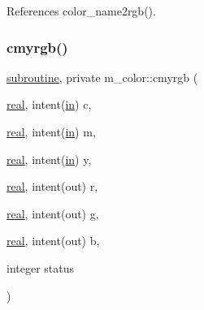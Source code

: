 References color\+\_\+name2rgb().

\mbox{\label{namespacem__color_ab91687e87d0901874e52efe5933e3044}} 
\subsubsection{\texorpdfstring{cmyrgb()}{cmyrgb()}}
{\footnotesize\ttfamily \hyperlink{M__stopwatch_83_8txt_acfbcff50169d691ff02d4a123ed70482}{subroutine}, private m\+\_\+color\+::cmyrgb (\begin{DoxyParamCaption}\item[{\hyperlink{read__watch_83_8txt_abdb62bde002f38ef75f810d3a905a823}{real}, intent(\hyperlink{M__journal_83_8txt_afce72651d1eed785a2132bee863b2f38}{in})}]{c,  }\item[{\hyperlink{read__watch_83_8txt_abdb62bde002f38ef75f810d3a905a823}{real}, intent(\hyperlink{M__journal_83_8txt_afce72651d1eed785a2132bee863b2f38}{in})}]{m,  }\item[{\hyperlink{read__watch_83_8txt_abdb62bde002f38ef75f810d3a905a823}{real}, intent(\hyperlink{M__journal_83_8txt_afce72651d1eed785a2132bee863b2f38}{in})}]{y,  }\item[{\hyperlink{read__watch_83_8txt_abdb62bde002f38ef75f810d3a905a823}{real}, intent(out)}]{r,  }\item[{\hyperlink{read__watch_83_8txt_abdb62bde002f38ef75f810d3a905a823}{real}, intent(out)}]{g,  }\item[{\hyperlink{read__watch_83_8txt_abdb62bde002f38ef75f810d3a905a823}{real}, intent(out)}]{b,  }\item[{integer}]{status }\end{DoxyParamCaption})\hspace{0.3cm}{\ttfamily [private]}}


